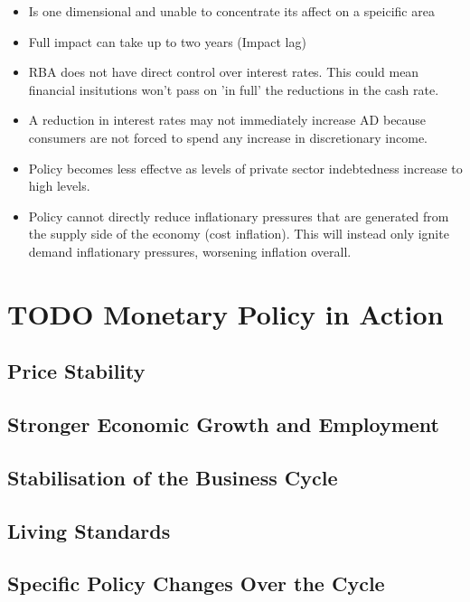 \documentclass[11pt]{article}
\begin{document}
\begin{itemize}
\item Is one dimensional and unable to concentrate its affect on a speicific area
\item Full impact can take up to two years (Impact lag)
\item RBA does not have direct control over interest rates. This could
mean financial insitutions won't pass on 'in full' the reductions in
the cash rate.
\item A reduction in interest rates may not immediately increase AD
because consumers are not forced to spend any increase in
discretionary income.
\item Policy becomes less effectve as levels of private sector
indebtedness increase to high levels.
\item Policy cannot directly reduce inflationary pressures that are
generated from the supply side of the economy (cost inflation). This
will instead only ignite demand inflationary pressures, worsening
inflation overall.
\end{itemize}


\section{{\bfseries\sffamily TODO} Monetary Policy in Action}
\label{sec-4}

\subsection{Price Stability}
\label{sec-4-1}

\subsection{Stronger Economic Growth and Employment}
\label{sec-4-2}

\subsection{Stabilisation of the Business Cycle}
\label{sec-4-3}

\subsection{Living Standards}
\label{sec-4-4}

\subsection{Specific Policy Changes Over the Cycle}
\label{sec-4-5}
\end{document}
